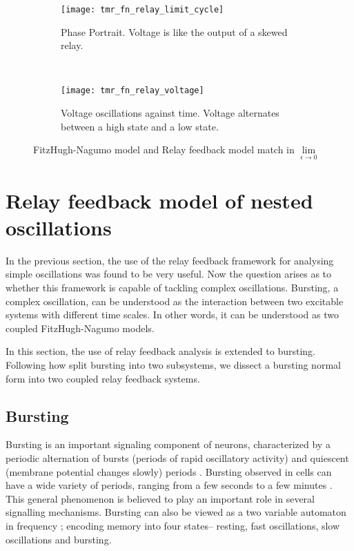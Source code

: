 \documentclass[a4paper, 12pt]{article}
\begin{document}
\begin{figure}[h!]
    \centering
    \begin{subfigure}[t]{0.45\textwidth}
        \texttt{[image: tmr\_fn\_relay\_limit\_cycle]}
        \caption{Phase Portrait. Voltage is like the output of a skewed relay.}
        \label{fig:f_n_relay_limit_cycle}
    \end{subfigure}
    ~ %
    \begin{subfigure}[t]{0.45\textwidth}
        \texttt{[image: tmr\_fn\_relay\_voltage]}
        \caption{Voltage oscillations against time. Voltage alternates between a high state and a low state.}
        \label{fig:f_n_relay_voltage}
    \end{subfigure}
\caption{FitzHugh-Nagumo model and Relay feedback model match in $\lim\limits_{\epsilon\to 0}$}
\label{fig:matching_fitz_relay}
\end{figure}

\FloatBarrier
\clearpage
\section{Relay feedback model of nested oscillations}\label{Sec:nested oscillations}
In the previous section, the use of the relay feedback framework for analysing simple oscillations was found to be very useful. Now the question arises as to whether this framework is capable of tackling complex oscillations. Bursting, a complex oscillation, can be understood as the interaction between two excitable systems with different time scales\cite{drion}. In other words, it can be understood as two coupled FitzHugh-Nagumo models. 

In this section, the use of relay feedback analysis is extended to bursting. Following how \cite{rinzel} split bursting into two subsystems, we dissect a bursting normal form into two coupled relay feedback systems. 

\subsection{Bursting}
Bursting is an important signaling component of neurons, characterized by a periodic alternation of bursts (periods of rapid oscillatory activity) and quiescent (membrane potential changes slowly) periods \cite{franci2}. Bursting observed in cells can have a wide variety of periods, ranging from a few seconds to a few minutes \cite{keener}. This general phenomenon is believed to play an important role in several signalling mechanisms. Bursting can also be viewed as a two variable automaton in frequency \cite{drion}; encoding memory into four states-- resting, fast oscillations, slow oscillations and bursting. 
\end{document}
